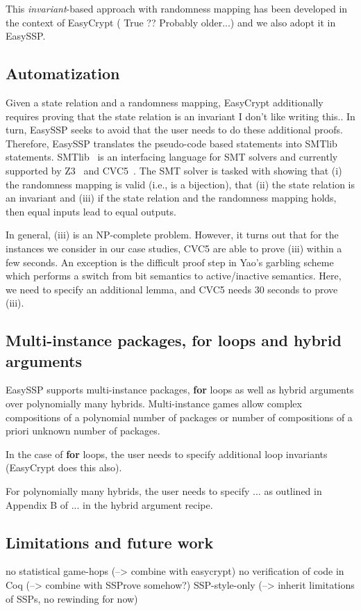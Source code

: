This \emph{invariant}-based approach with randomness mapping has been developed in the context of EasyCrypt {(\color{blue} True ?? Probably older...)} and we also adopt it in EasySSP.

\subsection{Automatization}
Given a state relation and a randomness mapping, EasyCrypt additionally requires
proving that the state relation is an invariant {\color{blue} I don't like writing this.}. In turn, EasySSP seeks to avoid that the user needs to do these additional proofs. Therefore, EasySSP translates the pseudo-code based statements into SMTlib statements. SMTlib~\cite{X} is an interfacing language for SMT solvers and currently supported by Z3~\cite{X} and CVC5~\cite{X}. The SMT solver is tasked with showing that (i) the randomness mapping is valid (i.e., is a bijection), that (ii) the state relation is an invariant and (iii) if the state relation and the randomness mapping holds, then equal inputs lead to equal outputs.

In general, (iii) is an NP-complete problem. However, it turns out that for the instances we consider in our case studies, CVC5 are able to prove (iii) within a few seconds. An exception is the difficult proof step in Yao's garbling scheme which performs a switch from bit semantics to active/inactive semantics. Here, we need to specify an additional lemma, and CVC5 needs 30 seconds to prove (iii).

\subsection{Multi-instance packages, \textbf{for} loops and hybrid arguments}
EasySSP supports multi-instance packages, \textbf{for} loops as well as hybrid arguments over polynomially many hybrids. Multi-instance games allow complex
compositions of a polynomial number of packages or number of compositions of
a priori unknown number of packages.

In the case of \textbf{for} loops, the user needs to specify additional loop invariants (EasyCrypt does this also).

For polynomially many hybrids, the user needs to specify ... as outlined in Appendix B of ... in the hybrid argument recipe.




\subsection{Limitations and future work}
no statistical game-hops (--> combine with easycrypt)
no verification of code in Coq (--> combine with SSProve somehow?)
SSP-style-only (--> inherit limitations of SSPs, no rewinding for now)





